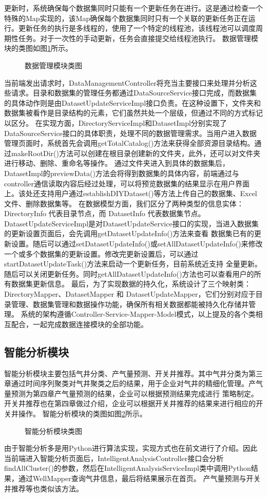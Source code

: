 更新时，系统确保每个数据集同时只能有一个更新任务在进行。这是通过检查一个特殊的Map实现的，该Map确保每个数据集同时只有一个关联的更新任务正在运行。更新任务的执行是多线程的，使用了一个特定的线程池，该线程池可以调度周期性任务。对于一次性的手动更新，任务会直接提交给线程池执行。
数据管理模块的类图如图\ref{fig:datamanageclass}所示。
\begin{figure}[H]
    \centering
    \caption{数据管理模块类图}
    \label{fig:datamanageclass}
\end{figure}
当前端发出请求时，DataManagementController将充当主要接口来处理并分析这些请求。目录和数据集的管理任务都通过DataSourceService接口完成，而数据集的具体动作则是由DatasetUpdateServiceImpl接口负责。在这种设置下，文件夹和数据集被看作是目录结构的元素，它们虽然共处一个层级，但通过不同的方式标记以区分。
在实现方面，DirectoryServiceImpl和DatasetImpl分别实现了DataSourceService接口的具体职责，处理不同的数据管理需求。当用户进入数据管理页面时，系统首先会调用getTotalCatalog()方法来获得全部资源目录结构。通过makeRootDir()方法可以创建在根目录创建新的文件夹，此外，还可以对文件夹进行移动、删除、重命名等操作。
通过文件夹进入到具体的数据集后，DatasetImpl的previewData()方法会将得到数据集的具体内容，前端通过与controller通信读取内容后经过处理，可以将预览数据集的结果显示在用户界面上。该处还支持用户通过establishDIYDataset()等方法上传自己的数据集、Excel文件、删除数据集等。
在数据模型方面，我们区分了两种类型的信息实体：DirectoryInfo 代表目录节点，而 DatasetInfo 代表数据集节点。DatasetUpdateServiceImpl是对DatasetUpdateService接口的实现，当进入数据集的更新设置页面后，会先调用getDatasetUpdateInfo()方法来查看
数据集已有的更新设置。随后可以通过setDatasetUpdateInfo()或setAllDatasetUpdateInfo()来修改一个或多个数据集的更新设置。修改完更新设置后，可以通过startDatasetUpdateTask()方法来启动一个更新任务，目前系统近支持
全量更新。随后可以关闭更新任务。同时getAllDatasetUpdateInfo()方法也可以查看用户的所有数据集更新信息。
最后，为了实现数据的持久化，系统设计了三个映射类：DirectoryMapper、DatasetMapper 和 DatasetUpdateMapper，它们分别对应于目录管理、数据集管理和数据操作功能，确保所有相关数据都能被持久化存储并管理。
系统的架构遵循Controller-Service-Mapper-Model模式，以上提及的各个类相互配合，一起完成数据连接模块的全部功能。
\subsection{智能分析模块}
智能分析模块主要包括气井分类、产气量预测、开关井推荐。其中气井分类为第三章通过时间序列聚类对气井聚类之后的结果，用于企业对气井的精细化管理。产气量预测为第四章产气量预测的结果，企业可以根据预测结果完成进行
策略制定。开关井推荐也在第四章做过介绍，企业可以根据开关井推荐的结果来进行相应的开关井操作。
智能分析模块的类图如图\ref{fig:analyclass}所示。
\begin{figure}[H]
    \centering
    \caption{智能分析模块类图}
    \label{fig:analyclass}
\end{figure}
由于智能分析多是用Python进行算法实现，实现方式也在前文进行了介绍。因此当前端进入智能分析页面后，IntelligentAnalysisController接口会分析findAllCluster()的参数，然后在IntelligentAnalysisServiceImpl类中调用Python结果，通过WellMapper查询气井信息，最后将结果展示在首页。
产气量预测与开关井推荐等也类似该方法。
